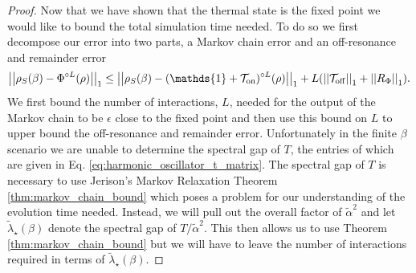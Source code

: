 \documentclass[
 amsmath,amssymb,
 aps,
onecolumn, 
nofootinbib]{revtex4-2}
\newcommand{\on}{\rm on}
\newcommand{\off}{\rm off}
\newcommand{\norm}[1]{\left|\left| #1 \right|\right|}
\newcommand{\TT}{\mathcal{T}}
\newcommand{\identity}{\mathds{1}}
\begin{document}
\begin{proof}
    Now that we have shown that the thermal state is the fixed point we would like to bound the total simulation time needed. To do so we first decompose our error into two parts, a Markov chain error and an off-resonance and remainder error
    \begin{equation}
        \norm{\rho_S(\beta) - \Phi^{\circ L}(\rho)}_1 \le \norm{\rho_S(\beta) - (\identity + \TT_{\on})^{\circ L}(\rho)}_1 + L(\norm{\TT_{\off}}_1 + \norm{R_{\Phi}}_1 ). \label{eq:harmonic_oscillator_error_breakdown}
    \end{equation}
    We first bound the number of interactions, $L$, needed for the output of the Markov chain to be $\epsilon$ close to the fixed point and then use this bound on $L$ to upper bound the off-resonance and remainder error. Unfortunately in the finite $\beta$ scenario we are unable to determine the spectral gap of $T$, the entries of which are given in Eq. \eqref{eq:harmonic_oscillator_t_matrix}.  The spectral gap of $T$ is necessary to use Jerison's Markov Relaxation Theorem \ref{thm:markov_chain_bound} which poses a problem for our understanding of the evolution time needed. Instead, we will pull out the overall factor of $\widetilde{\alpha}^2$ and let $\widetilde{\lambda}_\star(\beta)$ denote the spectral gap of $T/\widetilde{\alpha}^2$. This then allows us to use Theorem \ref{thm:markov_chain_bound} but we will have to leave the number of interactions required in terms of $\widetilde{\lambda}_\star(\beta)$.


\end{proof}
\end{document}
